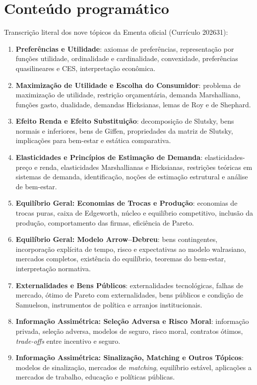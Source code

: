 \documentclass[11pt,a4paper]{article}
\begin{document}
\section{Conteúdo programático}

Transcrição literal dos nove tópicos da Ementa oficial (Currículo 202631):

\begin{enumerate}
  \item \textbf{Preferências e Utilidade}: axiomas de preferências, representação por funções utilidade, ordinalidade e cardinalidade, convexidade, preferências quasilineares e CES, interpretação econômica.
  \item \textbf{Maximização de Utilidade e Escolha do Consumidor}: problema de maximização de utilidade, restrição orçamentária, demanda Marshalliana, funções gasto, dualidade, demandas Hicksianas, lemas de Roy e de Shephard.
  \item \textbf{Efeito Renda e Efeito Substituição}: decomposição de Slutsky, bens normais e inferiores, bens de Giffen, propriedades da matriz de Slutsky, implicações para bem-estar e estática comparativa.
  \item \textbf{Elasticidades e Princípios de Estimação de Demanda}: elasticidades-preço e renda, elasticidades Marshallianas e Hicksianas, restrições teóricas em sistemas de demanda, identificação, noções de estimação estrutural e análise de bem-estar.
  \item \textbf{Equilíbrio Geral: Economias de Trocas e Produção}: economias de trocas puras, caixa de Edgeworth, núcleo e equilíbrio competitivo, inclusão da produção, comportamento das firmas, eficiência de Pareto.
  \item \textbf{Equilíbrio Geral: Modelo Arrow--Debreu}: bens contingentes, incorporação explícita de tempo, risco e expectativas ao modelo walrasiano, mercados completos, existência do equilíbrio, teoremas do bem-estar, interpretação normativa.
  \item \textbf{Externalidades e Bens Públicos}: externalidades tecnológicas, falhas de mercado, ótimo de Pareto com externalidades, bens públicos e condição de Samuelson, instrumentos de política e arranjos institucionais.
  \item \textbf{Informação Assimétrica: Seleção Adversa e Risco Moral}: informação privada, seleção adversa, modelos de seguro, risco moral, contratos ótimos, \textit{trade-offs} entre incentivo e seguro.
  \item \textbf{Informação Assimétrica: Sinalização, Matching e Outros Tópicos}: modelos de sinalização, mercados de \textit{matching}, equilíbrio estável, aplicações a mercados de trabalho, educação e políticas públicas.
\end{enumerate}
\end{document}
